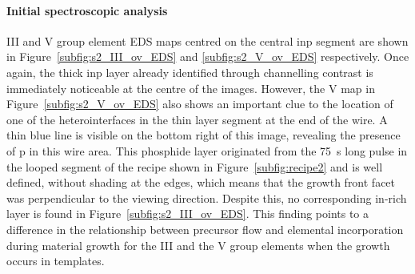 \paragraph{Initial spectroscopic analysis} III and V group element EDS maps centred on the central \acs{inp} segment are shown in Figure~\ref{subfig:s2_III_ov_EDS} and \ref{subfig:s2_V_ov_EDS} respectively. Once again, the thick \acs{inp} layer already identified through channelling contrast is immediately noticeable at the centre of the images. However, the V map in Figure~\ref{subfig:s2_V_ov_EDS} also shows an important clue to the location of one of the heterointerfaces in the thin layer segment at the end of the wire. A thin blue line is visible on the bottom right of this image, revealing the presence of \acl{p} in this wire area. This phosphide layer originated from the \qty{75}{\second} long pulse in the looped segment of the recipe shown in Figure~\ref{subfig:recipe2} and is well defined, without shading at the edges, which means that the growth front facet was perpendicular to the viewing direction. Despite this, no corresponding \acs{in}-rich layer is found in Figure~\ref{subfig:s2_III_ov_EDS}. This finding points to a difference in the relationship between precursor flow and elemental incorporation during material growth for the III and the V group elements when the growth occurs in templates.
\par

